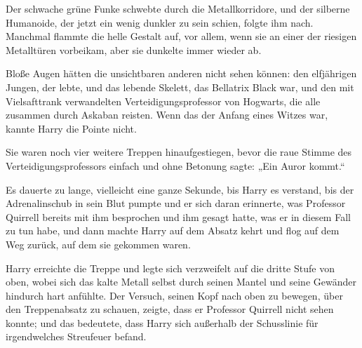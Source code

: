 \later

Der schwache grüne Funke schwebte durch die Metallkorridore, und der silberne Humanoide, der jetzt ein wenig dunkler zu sein schien, folgte ihm nach. Manchmal flammte die helle Gestalt auf, vor allem, wenn sie an einer der riesigen Metalltüren vorbeikam, aber sie dunkelte immer wieder ab.

Bloße Augen hätten die unsichtbaren anderen nicht sehen können: den elfjährigen Jungen, der lebte, und das lebende Skelett, das Bellatrix Black war, und den mit Vielsafttrank verwandelten Verteidigungsprofessor von Hogwarts, die alle zusammen durch Askaban reisten. Wenn das der Anfang eines Witzes war, kannte Harry die Pointe nicht.

Sie waren noch vier weitere Treppen hinaufgestiegen, bevor die raue Stimme des Verteidigungsprofessors einfach und ohne Betonung sagte: „Ein Auror kommt.“

Es dauerte zu lange, vielleicht eine ganze Sekunde, bis Harry es verstand, bis der Adrenalinschub in sein Blut pumpte und er sich daran erinnerte, was Professor Quirrell bereits mit ihm besprochen und ihm gesagt hatte, was er in diesem Fall zu tun habe, und dann machte Harry auf dem Absatz kehrt und flog auf dem Weg zurück, auf dem sie gekommen waren.

Harry erreichte die Treppe und legte sich verzweifelt auf die dritte Stufe von oben, wobei sich das kalte Metall selbst durch seinen Mantel und seine Gewänder hindurch hart anfühlte. Der Versuch, seinen Kopf nach oben zu bewegen, über den Treppenabsatz zu schauen, zeigte, dass er Professor Quirrell nicht sehen konnte; und das bedeutete, dass Harry sich außerhalb der Schusslinie für irgendwelches Streufeuer befand.

